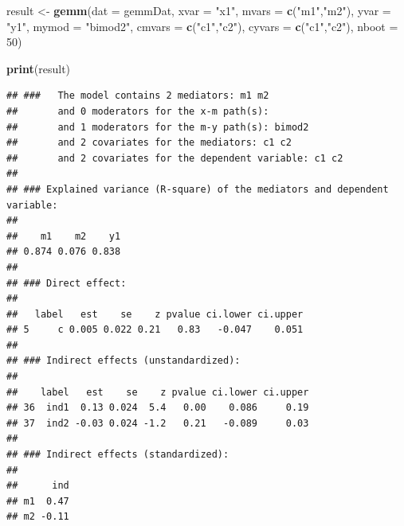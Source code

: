 \documentclass[man,floatsintext]{apa6}
\newenvironment{Shaded}{\begin{snugshade}}{\end{snugshade}}
\newcommand{\KeywordTok}[1]{\textcolor[rgb]{0.13,0.29,0.53}{\textbf{#1}}}
\newcommand{\DataTypeTok}[1]{\textcolor[rgb]{0.13,0.29,0.53}{#1}}
\newcommand{\DecValTok}[1]{\textcolor[rgb]{0.00,0.00,0.81}{#1}}
\newcommand{\StringTok}[1]{\textcolor[rgb]{0.31,0.60,0.02}{#1}}
\newcommand{\NormalTok}[1]{#1}
\theoremstyle{definition}
\theoremstyle{definition}
\theoremstyle{definition}
\theoremstyle{remark}
\begin{document}
\begin{Shaded}
\begin{Highlighting}[]
\NormalTok{result <-}\StringTok{ }\KeywordTok{gemm}\NormalTok{(}\DataTypeTok{dat =}\NormalTok{ gemmDat, }
               \DataTypeTok{xvar  =} \StringTok{"x1"}\NormalTok{, }
               \DataTypeTok{mvars =} \KeywordTok{c}\NormalTok{(}\StringTok{"m1"}\NormalTok{,}\StringTok{"m2"}\NormalTok{), }
               \DataTypeTok{yvar  =} \StringTok{"y1"}\NormalTok{,}
               \DataTypeTok{mymod =} \StringTok{"bimod2"}\NormalTok{, }
               \DataTypeTok{cmvars =} \KeywordTok{c}\NormalTok{(}\StringTok{"c1"}\NormalTok{,}\StringTok{"c2"}\NormalTok{), }
               \DataTypeTok{cyvars =} \KeywordTok{c}\NormalTok{(}\StringTok{"c1"}\NormalTok{,}\StringTok{"c2"}\NormalTok{),}
               \DataTypeTok{nboot =} \DecValTok{50}\NormalTok{)}

\KeywordTok{print}\NormalTok{(result)}
\end{Highlighting}
\end{Shaded}

\begin{verbatim}
## ###   The model contains 2 mediators: m1 m2 
##       and 0 moderators for the x-m path(s): 
##       and 1 moderators for the m-y path(s): bimod2 
##       and 2 covariates for the mediators: c1 c2 
##       and 2 covariates for the dependent variable: c1 c2
## 
## ### Explained variance (R-square) of the mediators and dependent variable:
## 
##    m1    m2    y1 
## 0.874 0.076 0.838 
## 
## ### Direct effect:
## 
##   label   est    se    z pvalue ci.lower ci.upper
## 5     c 0.005 0.022 0.21   0.83   -0.047    0.051
## 
## ### Indirect effects (unstandardized):
## 
##    label   est    se    z pvalue ci.lower ci.upper
## 36  ind1  0.13 0.024  5.4   0.00    0.086     0.19
## 37  ind2 -0.03 0.024 -1.2   0.21   -0.089     0.03
## 
## ### Indirect effects (standardized):
## 
##      ind
## m1  0.47
## m2 -0.11
\end{verbatim}
\end{document}
